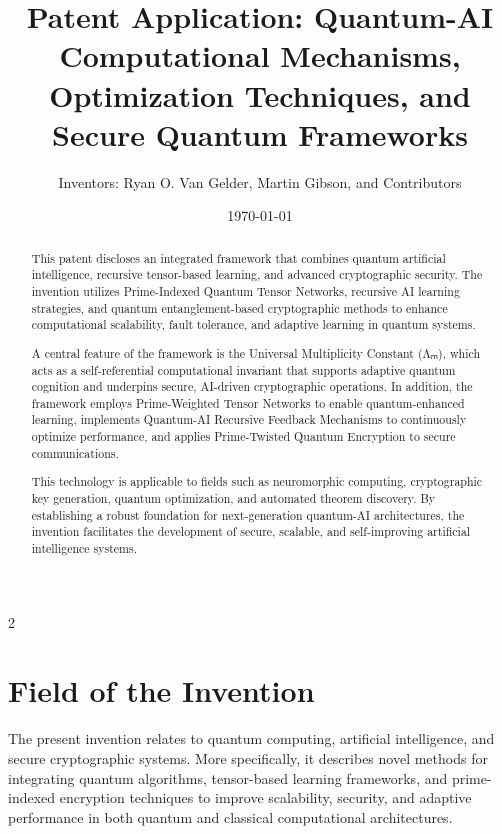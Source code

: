 \documentclass{article}
\title{Patent Application: Quantum-AI Computational Mechanisms, Optimization Techniques, and Secure Quantum Frameworks}
\author{Inventors: Ryan O. Van Gelder, Martin Gibson, and Contributors}
\affil{Citizen Gardens - The Foundation of Multiplicity}
\date{\today}
\theoremstyle{plain}
\begin{document}
\maketitle

\begin{abstract}
This patent discloses an integrated framework that combines quantum artificial intelligence, recursive tensor-based learning, and advanced cryptographic security. The invention utilizes Prime-Indexed Quantum Tensor Networks, recursive AI learning strategies, and quantum entanglement-based cryptographic methods to enhance computational scalability, fault tolerance, and adaptive learning in quantum systems.

A central feature of the framework is the Universal Multiplicity Constant (Λₘ), which acts as a self-referential computational invariant that supports adaptive quantum cognition and underpins secure, AI-driven cryptographic operations. In addition, the framework employs Prime-Weighted Tensor Networks to enable quantum-enhanced learning, implements Quantum-AI Recursive Feedback Mechanisms to continuously optimize performance, and applies Prime-Twisted Quantum Encryption to secure communications.

This technology is applicable to fields such as neuromorphic computing, cryptographic key generation, quantum optimization, and automated theorem discovery. By establishing a robust foundation for next-generation quantum-AI architectures, the invention facilitates the development of secure, scalable, and self-improving artificial intelligence systems.
\end{abstract}

\newpage
 \begin{multicols}{2}
\begin{singlespace}
\tableofcontents
\end{singlespace}
\end{multicols}

\section{Field of the Invention}
The present invention relates to quantum computing, artificial intelligence, and secure cryptographic systems. More specifically, it describes novel methods for integrating quantum algorithms, tensor-based learning frameworks, and prime-indexed encryption techniques to improve scalability, security, and adaptive performance in both quantum and classical computational architectures.
\end{document}
